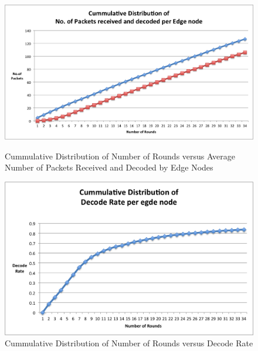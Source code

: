 \documentclass{acm_proc_article-sp}
\begin{document}
\begin{figure}[ht]
\begin{minipage}[b]{0.50\linewidth}
\centering
\includegraphics[width=\textwidth]{cummdistroundsvsavgpkt.png}
\caption{Cummulative Distribution of Number of Rounds versus Average Number of Packets Received and Decoded by Edge Nodes}
\label{cummdistroundsvsavgpkt}
\end{minipage}
\hspace{0.5cm}
\begin{minipage}[b]{0.50\linewidth}
\centering
\includegraphics[width=\textwidth]{cummdistnumroundsvsdecoderate.png}
\caption{Cummulative Distribution of Number of Rounds versus Decode Rate}
\label{cummdistnumroundsvsdecoderate}
\end{minipage}
\end{figure}
\end{document}
